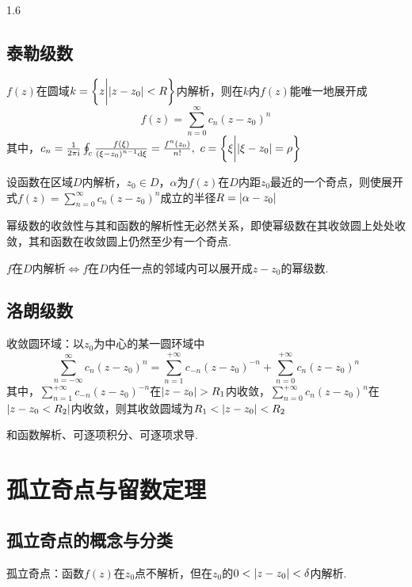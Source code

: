 \documentclass[lang=cn,10pt]{elegantbook}
\renewcommand{\i}{\mathrm{i}}
\begin{document}
\begin{spacing}{1.6}
\section{泰勒级数}
\begin{theorem}
$f\left(z\right)$在圆域$k=\left\{z\bigg|\abs{z-z_0}<R\right\}$内解析，则在$k$内$f\left(z\right)$能唯一地展开成
$$f\left(z\right)=\sum_{n=0}^{\infty}{c_n\left(z-z_0\right)^n}$$
其中，$c_n=\frac{1}{2\pi\i}\oint_c\frac{f\left(\xi\right)}{\left(\xi-z_0\right)^{n-1}\dd\xi}=\frac{f^n\left(z_0\right)}{n!},\ c=\left\{\xi\bigg|\abs{\xi-z_0}=\rho\right\}$
\end{theorem}
\begin{corollary}
设函数在区域$D$内解析，$z_0\in D$，$\alpha$为$f\left(z\right)$在$D$内距$z_0$最近的一个奇点，则使展开式$f\left(z\right)=\sum_{n=0}^{\infty}{c_n\left(z-z_0\right)^n}$成立的半径$R=\abs{\alpha-z_0}$
\begin{property}
幂级数的收敛性与其和函数的解析性无必然关系，即使幂级数在其收敛圆上处处收敛，其和函数在收敛圆上仍然至少有一个奇点.
\end{property}
\begin{note}
$f$在$D$内解析$\Longleftrightarrow f$在$D$内任一点的邻域内可以展开成$z-z_0$的幂级数.
\end{note}
\end{corollary}
\section{洛朗级数}
\begin{definition}
收敛圆环域：以$z_0$为中心的某一圆环域中
$$\sum_{n=-\infty}^{\infty}{c_n\left(z-z_0\right)^n}=\sum_{n=1}^{+\infty}{c_{-n}\left(z-z_0\right)^{-n}}+\sum_{n=0}^{+\infty}{c_n\left(z-z_0\right)^n}$$
其中，$\sum_{n=1}^{+\infty}{c_{-n}\left(z-z_0\right)^{-n}}$在$\abs{z-z_0}>R_1$内收敛，$\sum_{n=0}^{+\infty}{c_n\left(z-z_0\right)^n}$在$\abs{z-z_0<R_2}$内收敛，则其收敛圆域为$R_1<\abs{z-z_0}<R_2$
\begin{property}
和函数解析、可逐项积分、可逐项求导.
\end{property}
\end{definition}
\chapter{孤立奇点与留数定理}
\section{孤立奇点的概念与分类}
\begin{definition}
孤立奇点：函数$f\left(z\right)$在$z_0$点不解析，但在$z_0$的$0<\abs{z-z_0}<\delta$内解析.
\end{definition}

\end{spacing}
\end{document}
